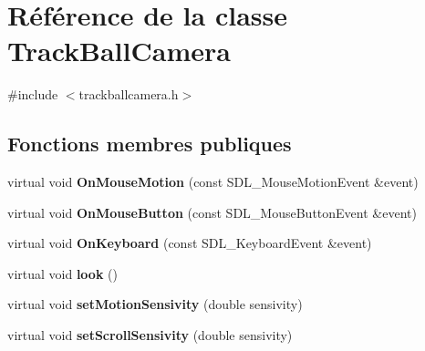 \hypertarget{class_track_ball_camera}{}\section{Référence de la classe Track\+Ball\+Camera}
\label{class_track_ball_camera}


{\ttfamily \#include $<$trackballcamera.\+h$>$}

\subsection*{Fonctions membres publiques}
\begin{DoxyCompactItemize}
\item 
\mbox{\label{class_track_ball_camera_a7a700f13749637899fb8749e8d136598}} 
virtual void {\bfseries On\+Mouse\+Motion} (const S\+D\+L\+\_\+\+Mouse\+Motion\+Event \&event)
\item 
\mbox{\label{class_track_ball_camera_a68e4695d4439a0f1a9dffdc474f9bcf2}} 
virtual void {\bfseries On\+Mouse\+Button} (const S\+D\+L\+\_\+\+Mouse\+Button\+Event \&event)
\item 
\mbox{\label{class_track_ball_camera_ac9d63bf5e2cc37176266d0f9002b6182}} 
virtual void {\bfseries On\+Keyboard} (const S\+D\+L\+\_\+\+Keyboard\+Event \&event)
\item 
\mbox{\label{class_track_ball_camera_ae7df52ed183dd63ec7ac6b6f4dd4f99d}} 
virtual void {\bfseries look} ()
\item 
\mbox{\label{class_track_ball_camera_a9942af262cd33039575f5c703304cc44}} 
virtual void {\bfseries set\+Motion\+Sensivity} (double sensivity)
\item 
\mbox{\label{class_track_ball_camera_a55305b75b15ea49df24b89d591798661}} 
virtual void {\bfseries set\+Scroll\+Sensivity} (double sensivity)
\end{DoxyCompactItemize}
